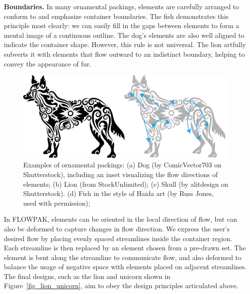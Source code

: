 \begin{items}
\item \textbf{Boundaries.} In many ornamental packings, elements are
  carefully arranged to conform to and emphasize container boundaries.
  The fish demonstrates this principle most clearly: we can easily
  fill in the gaps between elements to form a mental image of a continuous
  outline.  The dog's elements are also well aligned to indicate the
  container shape.  However, this rule is not universal.  
  The lion artfully subverts it with elements that flow outward to an
  indistinct boundary, helping to convey the appearance of fur.
\end{items}

\begin{figure}[t!] %
\centering
\includegraphics[width=1.0\textwidth]{figures/flowpak/dog_ornament_flow.pdf}
\caption[Examples of flow visual style]{
  \label{dog_flow}  
\newtext
{
Examples of ornamental packings: 
(a) Dog (by ComicVector703 on Shutterstock), 
including an inset visualizing the flow directions of elements; 
(b) Lion (from StockUnlimited);  
(c) Skull (by alitdesign on Shutterstock).
(d) Fish in the style of Haida art (by Russ Jones, used with permission); 
}
}
\end{figure}

In FLOWPAK, elements can be oriented in the local direction 
of flow, but can also be deformed to capture changes in flow direction.
We express the user's desired flow by placing evenly spaced streamlines
inside the container region.  Each streamline is then replaced by an
element chosen from a pre-drawn set.  The element is bent along the streamline
to communicate flow, and also deformed to balance the usage of negative space
with elements placed on adjacent streamlines.  The final designs, such
as the lion and unicorn shown in Figure~\ref{fig_lion_unicorn}, aim to obey the
design principles articulated above.




